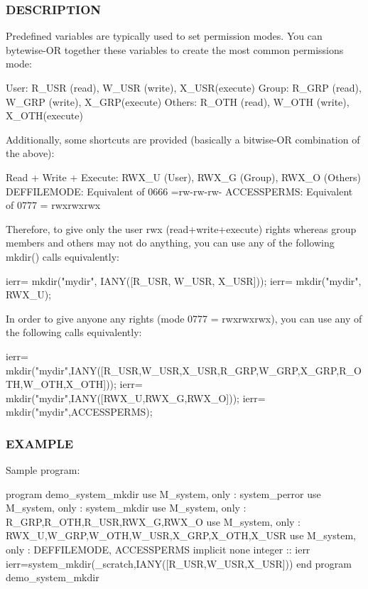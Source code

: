 \subsubsection*{D\+E\+S\+C\+R\+I\+P\+T\+I\+ON}

\begin{DoxyVerb}Predefined variables are typically used to set permission modes.
You can bytewise-OR together these variables to create the most common
permissions mode:

 User:    R_USR  (read),  W_USR  (write),  X_USR(execute)
 Group:   R_GRP  (read),  W_GRP  (write),  X_GRP(execute)
 Others:  R_OTH  (read),  W_OTH  (write),  X_OTH(execute)

Additionally, some shortcuts are provided (basically a bitwise-OR combination of the above):

  Read + Write + Execute: RWX_U (User), RWX_G (Group), RWX_O (Others)
  DEFFILEMODE: Equivalent of 0666 =rw-rw-rw-
  ACCESSPERMS: Equivalent of 0777 = rwxrwxrwx

Therefore, to give only the user rwx (read+write+execute) rights whereas
group members and others may not do anything, you can use any of the
following mkdir() calls equivalently:

  ierr= mkdir("mydir", IANY([R_USR, W_USR, X_USR]));
  ierr= mkdir("mydir", RWX_U);

In order to give anyone any rights (mode 0777 = rwxrwxrwx), you can
use any of the following calls equivalently:

  ierr= mkdir("mydir",IANY([R_USR,W_USR,X_USR,R_GRP,W_GRP,X_GRP,R_OTH,W_OTH,X_OTH]));
  ierr= mkdir("mydir",IANY([RWX_U,RWX_G,RWX_O]));
  ierr= mkdir("mydir",ACCESSPERMS);
\end{DoxyVerb}


\subsubsection*{E\+X\+A\+M\+P\+LE}

Sample program\+:

program demo\+\_\+system\+\_\+mkdir use M\+\_\+system, only \+: system\+\_\+perror use M\+\_\+system, only \+: system\+\_\+mkdir use M\+\_\+system, only \+: R\+\_\+\+G\+RP,R\+\_\+\+O\+TH,R\+\_\+\+U\+SR,R\+W\+X\+\_\+G,R\+W\+X\+\_\+O use M\+\_\+system, only \+: R\+W\+X\+\_\+U,W\+\_\+\+G\+RP,W\+\_\+\+O\+TH,W\+\_\+\+U\+SR,X\+\_\+\+G\+RP,X\+\_\+\+O\+TH,X\+\_\+\+U\+SR use M\+\_\+system, only \+: D\+E\+F\+F\+I\+L\+E\+M\+O\+DE, A\+C\+C\+E\+S\+S\+P\+E\+R\+MS implicit none integer \+:\+: ierr ierr=system\+\_\+mkdir(\textquotesingle{}\+\_\+scratch\textquotesingle{},I\+A\+N\+Y(\mbox{[}\+R\+\_\+\+U\+S\+R,\+W\+\_\+\+U\+S\+R,\+X\+\_\+\+U\+S\+R\mbox{]})) end program demo\+\_\+system\+\_\+mkdir

